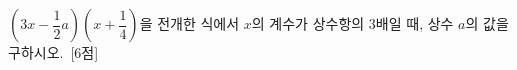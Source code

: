 $\left(3x-\dfrac{1}{2}a\right)\left(x+\dfrac{1}{4}\right)$을 전개한 식에서 $x$의 계수가 상수항의 $3$배일 때, 상수 $a$의 값을 구하시오.~\mbox{\mbox{[6점]}}
